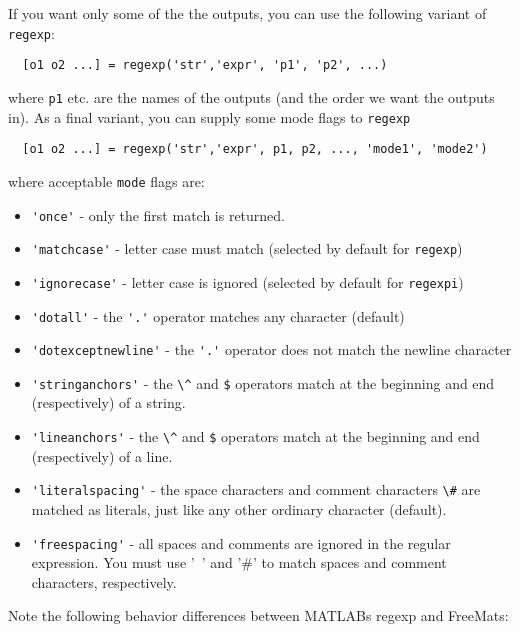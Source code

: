 If you want only some of the the outputs,  you can use the 
following variant of \verb|regexp|:
\begin{verbatim}
  [o1 o2 ...] = regexp('str','expr', 'p1', 'p2', ...)
\end{verbatim}
where \verb|p1| etc. are the names of the outputs (and the order we want
the outputs in).  As a final variant, you can supply some mode 
flags to \verb|regexp|
\begin{verbatim}
  [o1 o2 ...] = regexp('str','expr', p1, p2, ..., 'mode1', 'mode2')
\end{verbatim}
where acceptable \verb|mode| flags are:
\begin{itemize}
\item  \verb|'once'| - only the first match is returned.

\item  \verb|'matchcase'| - letter case must match (selected by default for \verb|regexp|)

\item  \verb|'ignorecase'| - letter case is ignored (selected by default for \verb|regexpi|)

\item  \verb|'dotall'| - the \verb|'.'| operator matches any character (default)

\item  \verb|'dotexceptnewline'| - the \verb|'.'| operator does not match the newline character

\item  \verb|'stringanchors'| - the \verb|\^| and \verb|$| operators match at the beginning and 
end (respectively) of a string.

\item  \verb|'lineanchors'| - the \verb|\^| and \verb|$| operators match at the beginning and
end (respectively) of a line.

\item  \verb|'literalspacing'| - the space characters and comment characters \verb|\#| are matched
as literals, just like any other ordinary character (default).

\item  \verb|'freespacing'| - all spaces and comments are ignored in the regular expression.
You must use '\ ' and '\#' to match spaces and comment characters, respectively.

\end{itemize}
Note the following behavior differences between MATLABs regexp and FreeMats:
